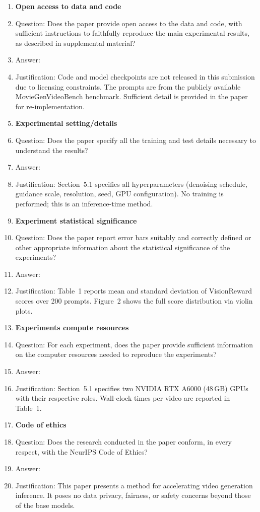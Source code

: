 \begin{enumerate}
\item {\bf Open access to data and code}
    \item[] Question: Does the paper provide open access to the data and code, with sufficient instructions to faithfully reproduce the main experimental results, as described in supplemental material?
    \item[] Answer: \answerNo{}
    \item[] Justification: Code and model checkpoints are not released in this submission due to licensing constraints. The prompts are from the publicly available MovieGenVideoBench benchmark. Sufficient detail is provided in the paper for re-implementation.

\item {\bf Experimental setting/details}
    \item[] Question: Does the paper specify all the training and test details necessary to understand the results?
    \item[] Answer: \answerYes{}
    \item[] Justification: Section~5.1 specifies all hyperparameters (denoising schedule, guidance scale, resolution, seed, GPU configuration). No training is performed; this is an inference-time method.

\item {\bf Experiment statistical significance}
    \item[] Question: Does the paper report error bars suitably and correctly defined or other appropriate information about the statistical significance of the experiments?
    \item[] Answer: \answerYes{}
    \item[] Justification: Table~1 reports mean and standard deviation of VisionReward scores over 200 prompts. Figure~2 shows the full score distribution via violin plots.

\item {\bf Experiments compute resources}
    \item[] Question: For each experiment, does the paper provide sufficient information on the computer resources needed to reproduce the experiments?
    \item[] Answer: \answerYes{}
    \item[] Justification: Section~5.1 specifies two NVIDIA RTX A6000 (48\,GB) GPUs with their respective roles. Wall-clock times per video are reported in Table~1.

\item {\bf Code of ethics}
    \item[] Question: Does the research conducted in the paper conform, in every respect, with the NeurIPS Code of Ethics?
    \item[] Answer: \answerYes{}
    \item[] Justification: This paper presents a method for accelerating video generation inference. It poses no data privacy, fairness, or safety concerns beyond those of the base models.


\end{enumerate}
